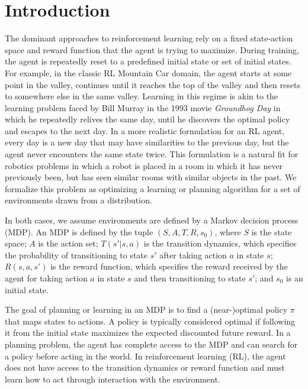 \section{Introduction}
The dominant approaches to reinforcement learning rely on a fixed
state-action space and reward function that the agent is trying to
maximize.  During training, the agent is repeatedly reset to a
predefined initial state or set of initial states.  For example, in
the classic RL Mountain Car domain, the agent starts at some point in
the valley, continues until it reaches the top of the valley and then
resets to somewhere else in the same valley. Learning in this regime
is akin to the learning problem faced by Bill Murray in the 1993 movie
{\em Groundhog Day} in which he repeatedly relives the same day, until
he discovers the optimal policy and escapes to the next day.  In a
more realistic formulation for an RL agent, every day is a new day
that may have similarities to the previous day, but the agent never
encounters the same state twice.  This formulation is a natural fit
for robotics problems in which a robot is placed in a room in which it
has never previously been, but has seen similar rooms with similar
objects in the past. We formalize this problem as optimizing a learning or planning
algorithm for a set of environments drawn from a distribution.

In both cases, we assume environments are defined by a Markov decision process (MDP). An MDP is defined by the tuple $(S, A, T, R, s_0)$, where $S$ is the state space; $A$ is the action set; $T(s' | s, a)$ is the transition dynamics, which specifies the probability of transitioning to state $s'$ after taking action $a$ in state $s$; $R(s, a, s')$ is the reward function, which specifies the reward received by the agent for taking action $a$ in state $s$ and then transitioning to state $s'$; and $s_0$ is an initial state.

The goal of planning or learning in an MDP is to find a (near-)optimal policy $\pi$ that maps states to actions. A policy is typically considered optimal if following it from the initial state maximizes the expected discounted future reward.
In a planning problem, the agent has complete access to the MDP and can search for a policy before acting in the world. In reinforcement learning (RL), the agent does not have access to the transition dynamics or reward function and must learn how to act through interaction with the environment.

